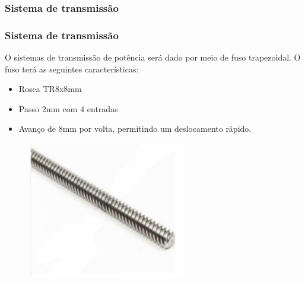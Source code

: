 \subsubsection{Sistema de transmissão}

\begin{frame}
\frametitle{Sistema de transmissão}

O sistemas de transmissão de potência  será dado por meio de fuso trapezoidal. 
O fuso terá as seguintes características:

\begin{itemize}
    \item Rosca TR8x8mm
    \item Passo 2mm com 4 entradas
    \item Avanço de 8mm por volta,  permitindo um deslocamento rápido.  
\end{itemize}

\begin{figure}
\centering
\includegraphics[scale = 0.45]{figuras/fusotrapezoidal}
\end{figure}
    
\end{frame}
